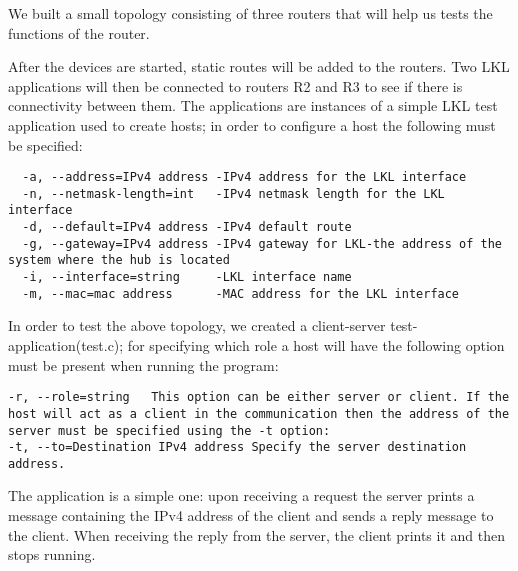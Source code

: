 {{We built a small topology consisting of three routers that will help us tests the functions of the router.

After the devices are started, static routes will be added to the routers. Two LKL applications will then be connected to routers R2 and R3 to see if there is connectivity between them. The applications are instances of a simple LKL test application used to create hosts; in order to configure a host the following must be specified: 
\begin{lstlisting}
  -a, --address=IPv4 address -IPv4 address for the LKL interface
  -n, --netmask-length=int   -IPv4 netmask length for the LKL interface
  -d, --default=IPv4 address -IPv4 default route
  -g, --gateway=IPv4 address -IPv4 gateway for LKL-the address of the system where the hub is located
  -i, --interface=string     -LKL interface name
  -m, --mac=mac address      -MAC address for the LKL interface
\end{lstlisting}

\begin{comment}
  -l, --lkl                  -means that this application uses LKL
  -p, --port=int             Port
  -r, --role=string          server/client
  -t, --to=Destination IPv4 address
                             IPv4 destination
\end{comment}
In order to test the above topology, we created a client-server test-application(test.c); for specifying which role a host will have the following option must be present when running the program:
\begin{lstlisting}
-r, --role=string   This option can be either server or client. If the host will act as a client in the communication then the address of the server must be specified using the -t option:
-t, --to=Destination IPv4 address Specify the server destination address.
\end{lstlisting} 
The application is a simple one: upon receiving a request the server prints a message containing the IPv4 address of the client and sends a reply message to the client. When receiving the reply from the server, the client prints it and then stops running.

}}
